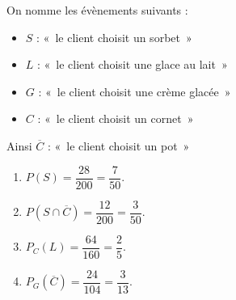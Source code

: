 On nomme les évènements suivants :

\begin{itemize}
	\item $S$ : «~le client choisit un sorbet~»
	\item $L$ : «~le client choisit une glace au lait~»
	\item $G$ : «~le client choisit une crème glacée~»
	\item $C$ : «~le client choisit un cornet~»
\end{itemize}

	Ainsi $\overline{C}$ : «~le client choisit un pot~»

\begin{enumerate}
	\item $P\left(S\right) = \dfrac{28}{200} = \dfrac{7}{50}$.

	\item $P\left(S\cap \overline{C}\right) = \dfrac{12}{200} = \dfrac{3}{50}$.

	\item $P_{C}\left(L\right) = \dfrac{64}{160} = \dfrac{2}{5}$.

	\item $P_{G}\left(\overline{C}\right) = \dfrac{24}{104} = \dfrac{3}{13}$.
\end{enumerate}

